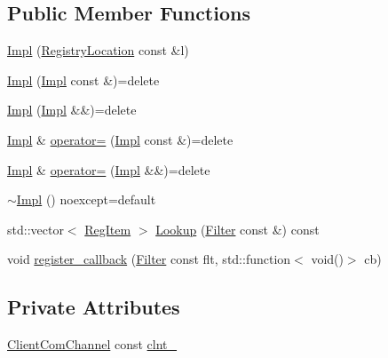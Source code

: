 \subsection*{Public Member Functions}
\begin{DoxyCompactItemize}
\item 
\hyperlink{classregistry_1_1ExtractorRegistryClient_1_1Impl_a17b812f50e898dafa7bd55ab32f682de}{Impl} (\hyperlink{structregistry_1_1RegistryLocation}{Registry\+Location} const \&l)
\item 
\hyperlink{classregistry_1_1ExtractorRegistryClient_1_1Impl_a40b247abc37f752c4692dc9ef01766d7}{Impl} (\hyperlink{classregistry_1_1ExtractorRegistryClient_1_1Impl}{Impl} const \&)=delete
\item 
\hyperlink{classregistry_1_1ExtractorRegistryClient_1_1Impl_ae20ac835c7ed8b4bf0551aa2966d9c72}{Impl} (\hyperlink{classregistry_1_1ExtractorRegistryClient_1_1Impl}{Impl} \&\&)=delete
\item 
\hyperlink{classregistry_1_1ExtractorRegistryClient_1_1Impl}{Impl} \& \hyperlink{classregistry_1_1ExtractorRegistryClient_1_1Impl_aa074380885dd859576d3dec0bb6428fd}{operator=} (\hyperlink{classregistry_1_1ExtractorRegistryClient_1_1Impl}{Impl} const \&)=delete
\item 
\hyperlink{classregistry_1_1ExtractorRegistryClient_1_1Impl}{Impl} \& \hyperlink{classregistry_1_1ExtractorRegistryClient_1_1Impl_aada6bfc4a190dc51f62f1ab00b9159af}{operator=} (\hyperlink{classregistry_1_1ExtractorRegistryClient_1_1Impl}{Impl} \&\&)=delete
\item 
\hyperlink{classregistry_1_1ExtractorRegistryClient_1_1Impl_af0aefd3ed554aa762e2458926a74602b}{$\sim$\+Impl} () noexcept=default
\item 
std\+::vector$<$ \hyperlink{classregistry_1_1RegItem}{Reg\+Item} $>$ \hyperlink{classregistry_1_1ExtractorRegistryClient_1_1Impl_aee705dc8ca2a3056bbb45ef25c57de16}{Lookup} (\hyperlink{classregistry_1_1Filter}{Filter} const \&) const
\item 
void \hyperlink{classregistry_1_1ExtractorRegistryClient_1_1Impl_aa85c7398b9da00a5eb35b9373b4a755d}{register\+\_\+callback} (\hyperlink{classregistry_1_1Filter}{Filter} const flt, std\+::function$<$ void()$>$ cb)
\end{DoxyCompactItemize}
\subsection*{Private Attributes}
\begin{DoxyCompactItemize}
\item 
\hyperlink{classregistry_1_1ClientComChannel}{Client\+Com\+Channel} const \hyperlink{classregistry_1_1ExtractorRegistryClient_1_1Impl_a702a01fb0fd983dbe146eb358736abd0}{clnt\+\_\+}
\end{DoxyCompactItemize}


